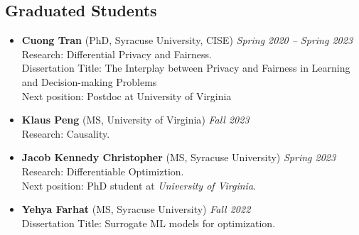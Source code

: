 \subsection*{Graduated Students}
\begin{itemize}
  \item \textbf{Cuong Tran} ({\sc PhD, Syracuse University}, CISE) 
  \hfill{\em Spring 2020 -- Spring 2023}\\
  {\sc Research}: Differential Privacy and Fairness.\\
  {\sc Dissertation Title:} The Interplay between Privacy and Fairness in
  Learning and Decision-making Problems\\
  {\sc Next position:} Postdoc at University of Virginia 

  \item \textbf{Klaus Peng} ({\sc MS, University of Virginia}) \hfill{\em Fall 2023}\\
  {\sc Research:} Causality.

  \item \textbf{Jacob Kennedy Christopher} ({\sc MS, Syracuse University}) \hfill{\em Spring 2023}\\
  {\sc Research:} Differentiable Optimiztion.\\
  {\sc Next position:} PhD student at \textit{University of Virginia}.

  \item \textbf{Yehya Farhat} ({\sc MS, Syracuse University}) \hfill{\em Fall 2022}\\
  {\sc Dissertation Title:} Surrogate ML models for optimization.
\end{itemize}

